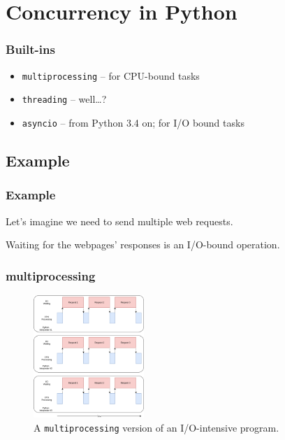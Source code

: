 \documentclass{beamer}
\begin{document}
    \section{Concurrency in Python}

    \begin{frame}
        \frametitle{Built-ins}

        \begin{itemize}
            \item \texttt{multiprocessing} -- for CPU-bound tasks
            \item \texttt{threading}  -- well\dots?
            \item \texttt{asyncio} -- from Python 3.4 on; for I/O bound tasks
        \end{itemize}


    \end{frame}

    \subsection{Example}

    \begin{frame}
        \frametitle{Example}

        Let's imagine we need to send multiple web requests.

        Waiting for the webpages' responses is an I/O-bound operation.


    \end{frame}

    \begin{frame}
        \frametitle{multiprocessing}

        \begin{figure}
            \includegraphics[height=175px]{../figures/MProc.png}
            \caption{A \texttt{multiprocessing} version of an I/O-intensive program.}
        \end{figure}

    \end{frame}
\end{document}
